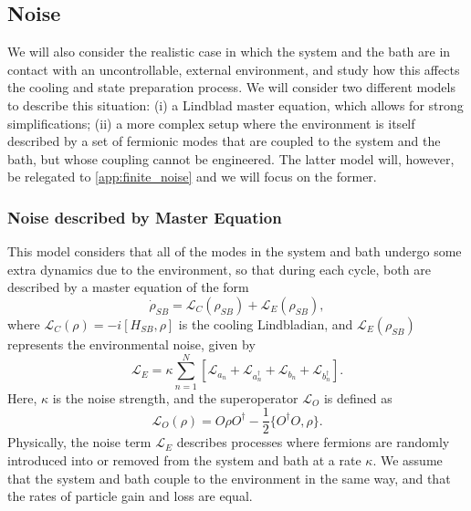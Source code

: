 \documentclass[aps,prx,twocolumn,superscriptaddress,nofootinbib,nolongbibliography,nobalancelastpage,10pt,floatfix]{revtex4-2}
\begin{document}
\subsection{Noise}

We will also consider the realistic case in which the system and the bath are in contact with an uncontrollable, external environment, and study how this affects the cooling and state preparation process. We will consider two different models to describe this situation: (i) a Lindblad master equation, which allows for strong simplifications; (ii) a more complex setup where the environment is itself described by a set of fermionic modes that are coupled to the system and the bath, but whose coupling cannot be engineered. The latter model will, however, be relegated to \cref{app:finite_noise} and we will focus on the former.

\subsubsection{Noise described by Master Equation}
\label{sec:adding_decoherence}

This model considers that all of the modes in the system and bath undergo some extra dynamics due to the environment, so that during each cycle, both are described by a master equation of the form
\begin{equation}
    \dot \rho_{SB} = \mathcal{L}_C(\rho_{SB}) + \mathcal{L}_E(\rho_{SB}),
\end{equation}
where $\mathcal{L}_C(\rho)=-i [H_{SB},\rho]$ is the cooling Lindbladian, and $\mathcal{L}_E(\rho_{SB})$ represents the environmental noise, given by
\begin{equation}
    \mathcal{L}_E = \kappa\sum_{n=1}^N \left[\mathcal{L}_{a_n} + \mathcal{L}_{a_n^\dagger} + \mathcal{L}_{b_n} + \mathcal{L}_{b_n^\dagger}\right].
    \label{eq:lindbladian}
\end{equation}
Here, $\kappa$ is the noise strength, and the superoperator $\mathcal{L}_{O}$ is defined as
\begin{equation}
    \mathcal{L}_O(\rho) = O\rho O^\dagger - \frac{1}{2}\{O^\dagger O,\rho\}.
    \label{eq:lindblad_superoperator}
\end{equation}
Physically, the noise term $\mathcal{L}_E$ describes processes where fermions are randomly introduced into or removed from the system and bath at a rate $\kappa$. We assume that the system and bath couple to the environment in the same way, and that the rates of particle gain and loss are equal.
\end{document}
